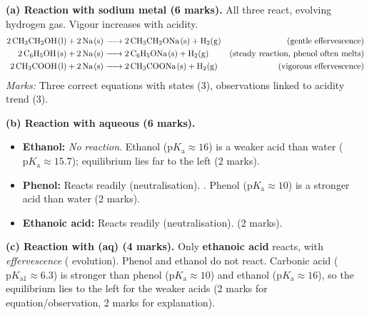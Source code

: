\documentclass[11pt]{article}
\begin{document}
\begin{corrige}
\textbf{(a) Reaction with sodium metal (6 marks).} All three react, evolving hydrogen gas. Vigour increases with acidity.
\begin{align*}
\ce{2CH3CH2OH(l) + 2Na(s) &-> 2CH3CH2ONa(s) + H2(g)} &\text{(gentle effervescence)} \\
\ce{2C6H5OH(s) + 2Na(s) &-> 2C6H5ONa(s) + H2(g)} &\text{(steady reaction, phenol often melts)} \\
\ce{2CH3COOH(l) + 2Na(s) &-> 2CH3COONa(s) + H2(g)} &\text{(vigorous effervescence)}
\end{align*}
\textit{Marks:} Three correct equations with states (3), observations linked to acidity trend (3).

\textbf{(b) Reaction with aqueous  (6 marks).}
\begin{itemize}
\item \textbf{Ethanol:} \emph{No reaction}. Ethanol ($\mathrm{p}K_{\mathrm{a}}\approx16$) is a weaker acid than water ($\mathrm{p}K_{\mathrm{a}}\approx15.7$); equilibrium  lies far to the left (2 marks).
\item \textbf{Phenol:} Reacts readily (neutralisation). . Phenol ($\mathrm{p}K_{\mathrm{a}}\approx10$) is a stronger acid than water (2 marks).
\item \textbf{Ethanoic acid:} Reacts readily (neutralisation).  (2 marks).
\end{itemize}

\textbf{(c) Reaction with  (aq) (4 marks).}
Only \textbf{ethanoic acid} reacts, with \emph{effervescence} ( evolution).
Phenol and ethanol do not react. Carbonic acid ($\mathrm{p}K_{\mathrm{a1}}\approx6.3$) is stronger than phenol ($\mathrm{p}K_{\mathrm{a}}\approx10$) and ethanol ($\mathrm{p}K_{\mathrm{a}}\approx16$), so the equilibrium lies to the left for the weaker acids (2 marks for equation/observation, 2 marks for explanation).


\end{corrige}
\end{document}
